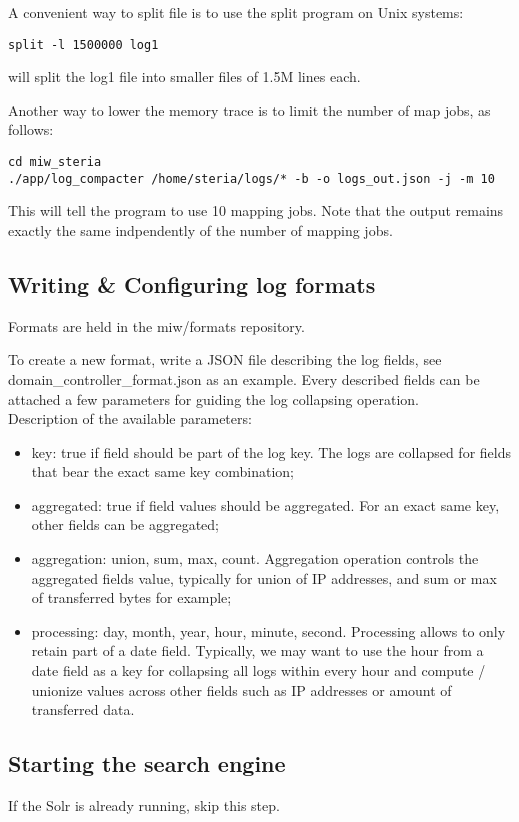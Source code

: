 \documentclass[twoside,11pt]{article}
\begin{document}
A convenient way to split file is to use the split program on Unix systems:
\begin{verbatim}
split -l 1500000 log1
\end{verbatim}
will split the log1 file into smaller files of 1.5M lines each.

Another way to lower the memory trace is to limit the number of map jobs, as follows:
\begin{verbatim}
cd miw_steria
./app/log_compacter /home/steria/logs/* -b -o logs_out.json -j -m 10
\end{verbatim}
This will tell the program to use 10 mapping jobs. Note that the output remains exactly the same indpendently of the number of mapping jobs.

\subsection{Writing \& Configuring log formats}
Formats are held in the miw\//formats repository.

To create a new format, write a JSON file describing the log fields, see domain\_controller\_format.json as an example.
Every described fields can be attached a few parameters for guiding the log collapsing operation.\\

Description of the available parameters:
\begin{itemize}
\item key: true if field should be part of the log key. The logs are collapsed for fields that bear the exact same key combination;
\item aggregated: true if field values should be aggregated. For an exact same key, other fields can be aggregated;
\item aggregation: union, sum, max, count. Aggregation operation controls the aggregated fields value, typically for union of IP addresses, and sum or max of transferred bytes for example;
\item processing: day, month, year, hour, minute, second. Processing allows to only retain part of a date field. Typically, we may want to use the hour from a date field as a key for collapsing all logs within every hour and compute / unionize values across other fields such as IP addresses or amount of transferred data.
\end{itemize}

\subsection{Starting the search engine}
If the Solr is already running, skip this step.
\end{document}

